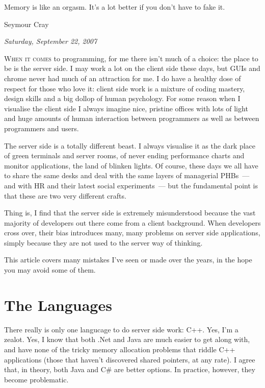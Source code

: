 \documentclass{book}
\begin{document}
\epigraph{Memory is like an orgasm. It's a lot better if you don't
  have to fake it.}{Seymour Cray}

\begin{flushright}
  \emph{Saturday, September 22, 2007}
\end{flushright}

\lettrine{W}{hen it comes} to programming, for me there isn't much of
a choice: the place to be is the server side. I may work a lot on the
client side these days, but GUIs and chrome never had much of an
attraction for me. I do have a healthy dose of respect for those who
love it: client side work is a mixture of coding mastery, design
skills and a big dollop of human psychology. For some reason when I
visualise the client side I always imagine nice, pristine offices with
lots of light and huge amounts of human interaction between
programmers as well as between programmers and users.

The server side is a totally different beast. I always visualise it as
the dark place of green terminals and server rooms, of never ending
performance charts and monitor applications, the land of blinken
lights. Of course, these days we all have to share the same desks and
deal with the same layers of managerial PHBs~--- and with HR and their
latest social experiments~--- but the fundamental point is that these
are two very different crafts.

Thing is, I find that the server side is extremely misunderstood
because the vast majority of developers out there come from a client
background. When developers cross over, their bias introduces many,
many problems on server side applications, simply because they are not
used to the server way of thinking.

This article covers many mistakes I've seen or made over the years, in
the hope you may avoid some of them.

\section{The Languages}

There really is only one langucage to do server side work: C++. Yes,
I'm a zealot. Yes, I know that both .Net and Java are much easier to
get along with, and have none of the tricky memory allocation problems
that riddle C++ applications (those that haven't discovered shared
pointers, at any rate). I agree that, in theory, both Java and C\# are
better options. In practice, however, they become problematic.
\end{document}

